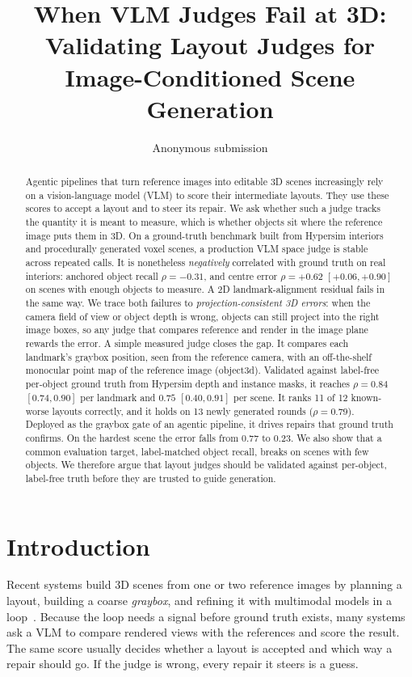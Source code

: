 \documentclass[10pt,twocolumn]{article}
\title{When VLM Judges Fail at 3D:\\Validating Layout Judges for Image-Conditioned Scene Generation}
\author{Anonymous submission}
\date{}
\begin{document}
\maketitle

\begin{abstract}
Agentic pipelines that turn reference images into editable 3D scenes increasingly rely on a vision-language model (VLM) to score their
intermediate layouts. They use these scores to accept a layout and to steer its repair. We ask whether such a judge tracks the
quantity it is meant to measure, which is whether objects sit where the reference image puts them in 3D. On a ground-truth benchmark
built from Hypersim interiors and procedurally generated voxel scenes, a production VLM space judge is stable across repeated calls.
It is nonetheless \emph{negatively} correlated with ground truth on real interiors: anchored object recall $\rho=-0.31$, and centre error
$\rho=+0.62$ $[+0.06,+0.90]$ on scenes with enough objects to measure. A 2D landmark-alignment residual fails in the same way.
We trace both failures to \emph{projection-consistent 3D errors}: when the camera field of view or object depth is wrong, objects can
still project into the right image boxes, so any judge that compares reference and render in the image plane rewards the error.
A simple measured judge closes the gap. It compares each landmark's graybox position, seen from the reference camera, with an
off-the-shelf monocular point map of the reference image (object3d). Validated against label-free per-object ground truth from
Hypersim depth and instance masks, it reaches $\rho=0.84$ $[0.74,0.90]$ per landmark and $0.75$ $[0.40,0.91]$ per scene. It ranks
11 of 12 known-worse layouts correctly, and it holds on 13 newly generated rounds ($\rho=0.79$). Deployed as the graybox gate of an
agentic pipeline, it drives repairs that ground truth confirms. On the hardest scene the error falls from 0.77 to 0.23. We also show
that a common evaluation target, label-matched object recall, breaks on scenes with few objects. We therefore argue that layout judges
should be validated against per-object, label-free truth before they are trusted to guide generation.
\end{abstract}

\section{Introduction}
Recent systems build 3D scenes from one or two reference images by planning a layout, building a coarse \emph{graybox}, and refining it
with multimodal models in a loop~\cite{scenelm,sceneconductor,scenepilot}. Because the loop needs a signal before ground truth exists,
many systems ask a VLM to compare rendered views with the references and score the result. The same score usually decides whether a
layout is accepted and which way a repair should go. If the judge is wrong, every repair it steers is a guess.
\end{document}
